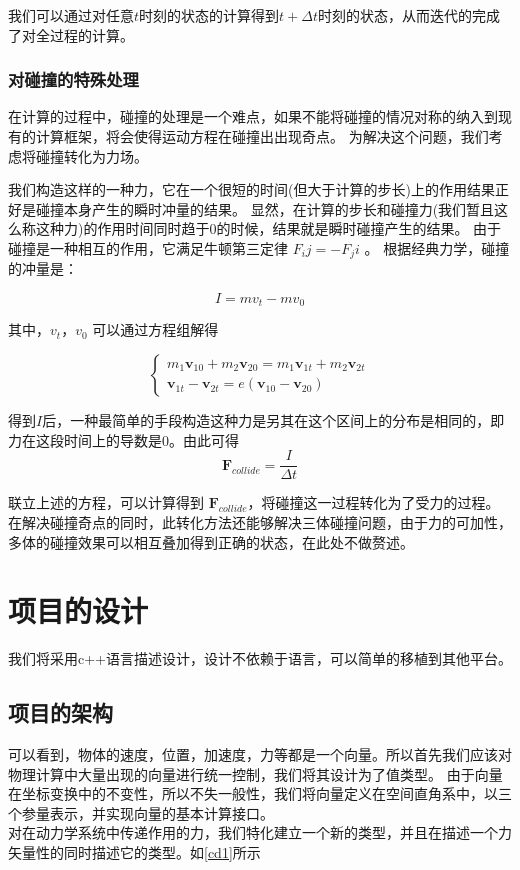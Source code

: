 我们可以通过对任意$t$时刻的状态的计算得到$t+\Delta t$时刻的状态，从而迭代的完成了对全过程的计算。

\subsection{对碰撞的特殊处理}
在计算的过程中，碰撞的处理是一个难点，如果不能将碰撞的情况对称的纳入到现有的计算框架，将会使得运动方程在碰撞出出现奇点。
为解决这个问题，我们考虑将碰撞转化为力场。


我们构造这样的一种力，它在一个很短的时间(但大于计算的步长)上的作用结果正好是碰撞本身产生的瞬时冲量的结果。
显然，在计算的步长和碰撞力(我们暂且这么称这种力)的作用时间同时趋于0的时候，结果就是瞬时碰撞产生的结果。
由于碰撞是一种相互的作用，它满足牛顿第三定律 $ F_ij = -F_ji $ 。
根据经典力学，碰撞的冲量是：

\[
    I = mv_t - mv_0
\]

其中，$v_t，v_0 $ 可以通过方程组解得

\[
    \left\{
    \begin{array}{l}
        {\displaystyle m_1 \bm{v}_{10} + m_2 \bm{v}_{20} = m_1\bm{v}_{1t}+m_2\bm{v}_{2t} }
        \\
        {\bm{v}_{1t}-\bm{v}_{2t} = e(\bm{v}_{10}-\bm{v}_{20})}
    \end{array}
    \right.
\]

得到$ I $后，一种最简单的手段构造这种力是另其在这个区间上的分布是相同的，即力在这段时间上的导数是$0$。由此可得
\[ \bm{F}_{collide} = \frac{I}{ \Delta t} \]

联立上述的方程，可以计算得到 $\bm{F}_{collide} $，将碰撞这一过程转化为了受力的过程。
在解决碰撞奇点的同时，此转化方法还能够解决三体碰撞问题，由于力的可加性，多体的碰撞效果可以相互叠加得到正确的状态，在此处不做赘述。

\chapter{项目的设计}
我们将采用c++语言描述设计，设计不依赖于语言，可以简单的移植到其他平台。
\section{项目的架构}
可以看到，物体的速度，位置，加速度，力等都是一个向量。所以首先我们应该对物理计算中大量出现的向量进行统一控制，我们将其设计为了值类型。
由于向量在坐标变换中的不变性，所以不失一般性，我们将向量定义在空间直角系中，以三个参量表示，并实现向量的基本计算接口。\\
对在动力学系统中传递作用的力，我们特化建立一个新的类型，并且在描述一个力矢量性的同时描述它的类型。如\ref{cd1}所示

